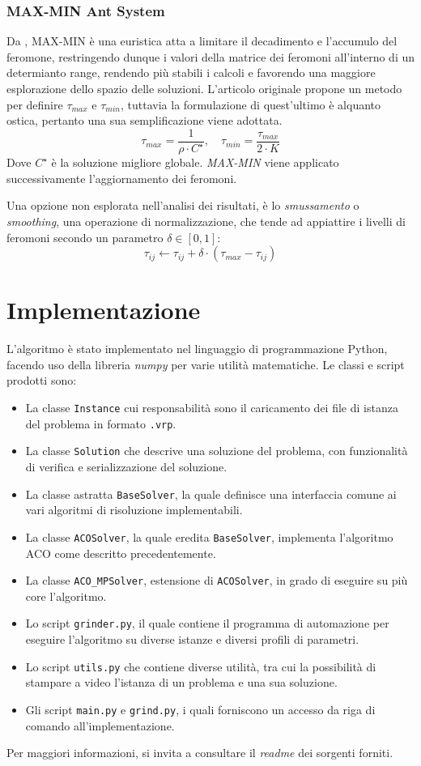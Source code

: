 \documentclass[11pt,a4paper]{article}
\begin{document}
\subsubsection{MAX-MIN Ant System}
Da \cite{STUTZLE2000889}, MAX-MIN è una euristica atta a limitare il decadimento e l'accumulo del feromone, restringendo dunque i valori della matrice dei feromoni all'interno di un determianto range, rendendo più stabili i calcoli e favorendo una maggiore esplorazione dello spazio delle soluzioni.
\noindent
L'articolo originale propone un metodo per definire $\tau_{max}$ e $\tau_{min}$, tuttavia la formulazione di quest'ultimo è alquanto ostica, pertanto una sua semplificazione viene adottata.
\[
\tau_{max} = \frac{1}{\rho \cdot C^\star },\quad \tau_{min} = \frac{\tau_{max}}{2\cdot K}
\]
\noindent
Dove \(C^\star\) è la soluzione migliore globale. \textit{MAX-MIN} viene applicato successivamente l'aggiornamento dei feromoni.

\vspace{0.3cm}
\noindent
Una opzione non esplorata nell'analisi dei risultati, è lo \textit{smussamento} o \textit{smoothing}, una operazione di normalizzazione, che tende ad appiattire i livelli di feromoni secondo un parametro $\delta \in [0,1] $:
\[
\tau_{ij} \xleftarrow{} \tau_{ij} + \delta\cdot(\tau_{max}-\tau_{ij})
\]

\section{Implementazione}
L'algoritmo è stato implementato nel linguaggio di programmazione Python, facendo uso della libreria \textit{numpy} per varie utilità matematiche. Le classi e script prodotti sono:
\begin{itemize}
    \item La classe \texttt{Instance} cui responsabilità sono il caricamento dei file di istanza del problema in formato \texttt{.vrp}.
    \item La classe \texttt{Solution} che descrive una soluzione del problema, con funzionalità di verifica e serializzazione del soluzione.
    \item La classe astratta \texttt{BaseSolver}, la quale definisce una interfaccia comune ai vari algoritmi di risoluzione implementabili.
    \item La classe \texttt{ACOSolver}, la quale eredita \texttt{BaseSolver}, implementa l'algoritmo ACO come descritto precedentemente.
    \item La classe \texttt{ACO\_MPSolver}, estensione di \texttt{ACOSolver}, in grado di eseguire su più core l'algoritmo.
    \item Lo script \texttt{grinder.py}, il quale contiene il programma di automazione per eseguire l'algoritmo su diverse istanze e diversi profili di parametri.
    \item Lo script \texttt{utils.py} che contiene diverse utilità, tra cui la possibilità di stampare a video l'istanza di un problema e una sua soluzione.
    \item Gli script \texttt{main.py} e \texttt{grind.py}, i quali forniscono un accesso da riga di comando all'implementazione. 
\end{itemize}
Per maggiori informazioni, si invita a consultare il \textit{readme} dei sorgenti forniti.
\end{document}
